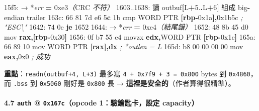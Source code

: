 \documentclass[10pt,a4paper]{article}
\newenvironment{Shaded}{\begin{snugshade}}{\end{snugshade}}
\newcommand{\BaseNTok}[1]{\textcolor[rgb]{0.00,0.00,0.81}{#1}}
\newcommand{\BuiltInTok}[1]{#1}
\newcommand{\CommentTok}[1]{\textcolor[rgb]{0.56,0.35,0.01}{\textit{#1}}}
\newcommand{\ControlFlowTok}[1]{\textcolor[rgb]{0.13,0.29,0.53}{\textbf{#1}}}
\newcommand{\DataTypeTok}[1]{\textcolor[rgb]{0.13,0.29,0.53}{#1}}
\newcommand{\DecValTok}[1]{\textcolor[rgb]{0.00,0.00,0.81}{#1}}
\newcommand{\ErrorTok}[1]{\textcolor[rgb]{0.64,0.00,0.00}{\textbf{#1}}}
\newcommand{\FloatTok}[1]{\textcolor[rgb]{0.00,0.00,0.81}{#1}}
\newcommand{\KeywordTok}[1]{\textcolor[rgb]{0.13,0.29,0.53}{\textbf{#1}}}
\newcommand{\NormalTok}[1]{#1}
\newcommand{\OperatorTok}[1]{\textcolor[rgb]{0.81,0.36,0.00}{\textbf{#1}}}
\newcommand{\PreprocessorTok}[1]{\textcolor[rgb]{0.56,0.35,0.01}{\textit{#1}}}
\renewenvironment{Shaded}{%
  \def\FrameCommand{\fboxsep=3.2pt\colorbox{shadecolor}}%
  \MakeFramed{\advance\hsize-\width\FrameRestore\small}%
}{%
  \endMakeFramed
}
\begin{document}
\begin{Shaded}
\begin{Highlighting}[]
\NormalTok{15f5: → *}\PreprocessorTok{err} \OperatorTok{=} \BaseNTok{0xe3}\PreprocessorTok{（}\NormalTok{CRC }\PreprocessorTok{不符）}
\NormalTok{1603..1638: 讀 outbuf}\OperatorTok{[}\NormalTok{L}\OperatorTok{+}\FloatTok{5.}\OperatorTok{.}\NormalTok{L}\OperatorTok{+}\DecValTok{6}\OperatorTok{]}\NormalTok{ 組成 big}\OperatorTok{{-}}\NormalTok{endian trailer}
\NormalTok{163c: 66 81 7d e6 }\DecValTok{5}\ErrorTok{c} \BaseNTok{1b}\NormalTok{      cmp    }\DataTypeTok{WORD} \DataTypeTok{PTR} \OperatorTok{[}\KeywordTok{rbp}\OperatorTok{{-}}\BaseNTok{0x1a}\OperatorTok{],}\BaseNTok{0x1b5c}   \CommentTok{; "ESC\textbackslash{}"}
\NormalTok{1642: 74 0e                  }\ControlFlowTok{je}     \DecValTok{1652}
\NormalTok{1644: → *}\PreprocessorTok{err} \OperatorTok{=} \BaseNTok{0xe4}\PreprocessorTok{（結尾錯）}
\NormalTok{1652: 48 8b 45 d0            mov    }\KeywordTok{rax}\OperatorTok{,[}\KeywordTok{rbp}\OperatorTok{{-}}\BaseNTok{0x30}\OperatorTok{]}
\NormalTok{1656: 0f b7 }\DecValTok{55}\NormalTok{ e4            movzx  }\KeywordTok{edx}\OperatorTok{,}\DataTypeTok{WORD} \DataTypeTok{PTR} \OperatorTok{[}\KeywordTok{rbp}\OperatorTok{{-}}\BaseNTok{0x1c}\OperatorTok{]}
\NormalTok{165a: 66 89 10               }\BuiltInTok{mov}    \DataTypeTok{WORD} \DataTypeTok{PTR} \OperatorTok{[}\KeywordTok{rax}\OperatorTok{],}\KeywordTok{dx}     \CommentTok{; *outlen = L}
\NormalTok{165d: b8 }\DecValTok{00} \DecValTok{00} \DecValTok{00} \DecValTok{00}\NormalTok{         mov    }\KeywordTok{eax}\OperatorTok{,}\BaseNTok{0x0}               \CommentTok{; 成功}
\end{Highlighting}
\end{Shaded}

\textbf{重點}：\texttt{readn(outbuf+4,\allowbreak{}\ \allowbreak{}L+3)} 最多寫
\texttt{4\ \allowbreak{}+\ \allowbreak{}0x7f9\ \allowbreak{}+\ \allowbreak{}3\ \allowbreak{}=\ \allowbreak{}0x800} bytes 到 \texttt{0x4860}， 而
\texttt{.\allowbreak{}bss} 到 \texttt{0x5060} 剛好是 \texttt{0x800} 長 →
\textbf{這裡是安全的}（作者算得很精準）。

\paragraph{\texorpdfstring{4.7 \texttt{auth} @ \texttt{0x167c}（opcode
1：驗鑰匙卡，設定
capacity）}{4.7 auth @ 0x167c（opcode 1：驗鑰匙卡，設定 capacity）}}\label{auth-0x167copcode-1ux9a57ux9470ux5319ux5361ux8a2dux5b9a-capacity}
\end{document}
